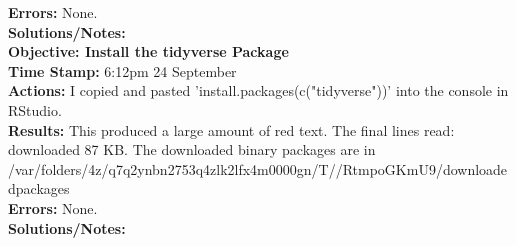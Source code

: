 \documentclass{article}
\begin{document}
\begin{FlushLeft}
\textbf{Errors:} None.\\
\textbf{Solutions/Notes:}\\
\vspace{5mm}
\textbf{Objective: Install the tidyverse Package}\label{Setup}\\ 
\textbf{Time Stamp:} 6:12pm 24 September\\
\textbf{Actions:} I copied and pasted 'install.packages(c("tidyverse"))' into the console in RStudio.\\
\textbf{Results:} This produced a large amount of red text. The final lines read: downloaded 87 KB. The downloaded binary packages are in\\ /var/folders/4z/q7q2ynbn2753q4zlk2lfx4\textunderscore m0000gn/T//RtmpoGKmU9/downloaded\textunderscore packages\\
\textbf{Errors:} None.\\
\textbf{Solutions/Notes:}\\


\end{FlushLeft}
\end{document}
